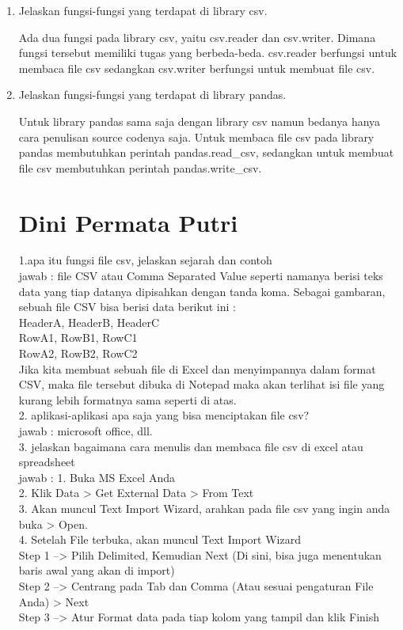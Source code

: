\begin{enumerate}
\item Jelaskan fungsi-fungsi yang terdapat di library csv.
\par
	Ada dua fungsi pada library csv, yaitu csv.reader dan csv.writer. Dimana fungsi tersebut memiliki tugas yang berbeda-beda. csv.reader berfungsi untuk membaca file csv sedangkan csv.writer berfungsi untuk membuat file csv.

\item Jelaskan fungsi-fungsi yang terdapat di library pandas.
\par
	Untuk library pandas sama saja dengan library csv namun bedanya hanya cara penulisan source codenya saja. Untuk membaca file csv pada library pandas membutuhkan perintah pandas.read\_csv, sedangkan untuk membuat file csv membutuhkan perintah pandas.write\_csv.

\section{Dini Permata Putri}
1.apa itu fungsi file csv, jelaskan sejarah dan contoh\\
jawab : file CSV atau Comma Separated Value seperti namanya berisi teks data yang tiap datanya dipisahkan dengan tanda koma. Sebagai gambaran, sebuah file CSV bisa berisi data berikut ini :\\
HeaderA, HeaderB, HeaderC\\
RowA1, RowB1, RowC1\\
RowA2, RowB2, RowC2\\
Jika kita membuat sebuah file di Excel dan menyimpannya dalam format CSV, maka file tersebut dibuka di Notepad maka akan terlihat isi file yang kurang lebih formatnya sama seperti di atas.\\

2. aplikasi-aplikasi apa saja yang bisa menciptakan file csv?\\
jawab : microsoft office, dll.\\

3. jelaskan bagaimana cara menulis dan membaca file csv di excel atau spreadsheet\\
jawab : 1. Buka MS Excel Anda\\
2. Klik Data > Get External Data > From Text\\ 
3. Akan muncul Text Import Wizard, arahkan pada file csv yang ingin anda buka > Open.\\
4. Setelah File terbuka, akan muncul Text Import Wizard\\
Step 1 –> Pilih Delimited, Kemudian Next (Di sini, bisa juga menentukan baris awal yang akan di import)\\
Step 2 –> Centrang pada Tab dan Comma (Atau sesuai pengaturan File Anda) > Next\\
Step 3 –> Atur Format data pada tiap kolom yang tampil dan klik Finish\\


\end{enumerate}

